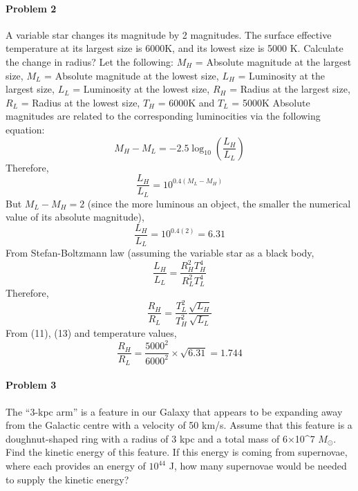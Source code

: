 \documentclass[11pt]{scrartcl}
\begin{document}
{\paragraph*{Problem 2}
A variable star changes its magnitude by 2 magnitudes. The surface effective temperature at its largest size is 6000K, and its lowest size is 5000 K. Calculate the change in radius?
\newline
Let the following:\newline
$M_H$ = Absolute magnitude at the largest size,\newline
$M_L$ = Absolute magnitude at the lowest size,\newline
$L_H$ = Luminosity at the largest size,\newline
$L_L$ = Luminosity at the lowest size,\newline
$R_H$ = Radius at the largest size,\newline
$R_L$ = Radius at the lowest size,\newline
$T_H$ = 6000K and $T_L$ = 5000K \newline
Absolute magnitudes are related to the corresponding luminocities via the following equation: 
\begin{equation}
    M_H - M_L = -2.5\log_{10}(\frac{L_H}{L_L})
\end{equation}
Therefore,
\begin{equation}
    \frac{L_H}{L_L} = 10^{0.4(M_L-M_H)}
\end{equation}
But $M_L-M_H=2$ (since the more luminous an object, the smaller the numerical value of its absolute magnitude),
\begin{equation}
    \frac{L_H}{L_L} = 10^{0.4(2)}=6.31
\end{equation}
From Stefan-Boltzmann law (assuming the variable star as a black body,
\begin{equation}
    \frac{L_H}{L_L} = \frac{R_H^2T_H^4}{R_L^2T_L^4}
\end{equation}
Therefore,
\begin{equation}
    \frac{R_H}{R_L} = \frac{T_L^2}{T_H^2}\frac{\sqrt{L_H}}{\sqrt{L_L}}
\end{equation}
From (11), (13) and temperature values,
\begin{equation}
    \frac{R_H}{R_L} = \frac{5000^2}{6000^2}\times\sqrt{6.31}=1.744
\end{equation}
\paragraph*{Problem 3}
The “3-kpc arm” is a feature in our Galaxy that appears to be expanding away from the Galactic centre with a velocity of 50 km/s. Assume that this feature is a doughnut-shaped ring with a radius of 3 kpc and a total mass of
6×10^7 \(M_\odot\). Find the kinetic energy of this feature. If this energy is coming from supernovae, where each provides an energy of $10^{44}$ J, how many supernovae would be needed to supply the kinetic energy?

}
\end{document}

